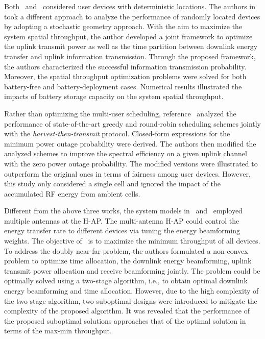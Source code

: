 \documentclass[twocolumn,10pt]{IEEEtran}
\begin{document}
Both~\cite{H.2014Ju} and~\cite{2014H.Ju} considered user devices with deterministic locations. The authors in~\cite{L.1409.3107Che} took a different approach to analyze the performance of randomly located devices by adopting a stochastic geometry approach. With the aim to maximize the system spatial throughput, the author developed a joint framework to optimize the uplink transmit power as well as the time partition between downlink energy transfer and uplink information transmission. Through the proposed framework, the authors characterized the successful information transmission probability. Moreover, the spatial throughput optimization problems were solved for both battery-free and battery-deployment cases.  
Numerical results illustrated the impacts of battery storage capacity on the system spatial throughput.  


Rather than optimizing the multi-user scheduling, reference~\cite{H.2015Tabassum} analyzed the performance of state-of-the-art greedy and round-robin scheduling schemes jointly with the \emph{harvest-then-transmit} protocol. Closed-form expressions for the minimum power outage probability were derived. The authors then modified the analyzed schemes to improve the spectral efficiency on a given uplink channel with the zero power outage probability. The modified versions were illustrated to outperform the original ones in terms of fairness among user devices. However, this study only considered a single cell and ignored the impact of the accumulated RF energy from ambient cells.     




Different from the above three works, the system models in~\cite{L.2014Liu} and~\cite{G.1403.3991Yang} employed multiple antennas at the H-AP. The multi-antenna H-AP could control the energy transfer rate to different devices via tuning the energy beamforming weights. 
The objective of~\cite{L.2014Liu} is to maximize the minimum throughput of all devices.
To address the doubly near-far problem, the authors formulated a non-convex problem to optimize time allocation, the downlink energy beamforming, uplink transmit power allocation and receive beamforming jointly. The problem could be optimally solved using a two-stage algorithm, i.e., to obtain optimal downlink energy beamforming and time allocation. However, due to the high complexity of the two-stage algorithm, two suboptimal designs were introduced to mitigate the complexity of the proposed algorithm. It was revealed that the performance of the proposed suboptimal solutions approaches that of the optimal solution in terms of the max-min throughput. 
\end{document}
